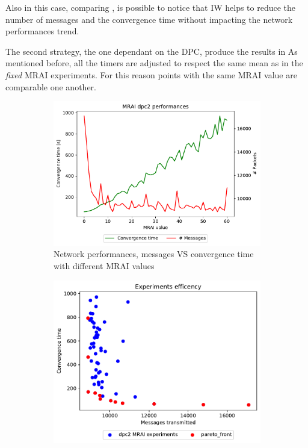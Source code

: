 Also in this case, comparing ,
is possible to notice that \ac{IW}
helps to reduce the number of messages and the convergence time without impacting
the network performances trend.

The second strategy, the one dependant on the \ac{DPC}, produce the results
in 
As mentioned before, all the timers are adjusted to respect the same mean as in
the \textit{fixed} \ac{MRAI} experiments.
For this reason points with the same \ac{MRAI} value are comparable one another.

\begin{figure}[h]
     \centering
     \begin{subfigure}[b]{0.45\textwidth}
         \centering
         \includegraphics[width=\textwidth]{images/internet_like/1000/dpc/internet_like-DPC_mrai_evolution.pdf}
		 \caption{Network performances, messages VS convergence time with different
			\ac{MRAI} values}
         \label{fig:internt_like_1000_DPC_evolution_evolution}
     \end{subfigure}
     \hfill
     \begin{subfigure}[b]{0.45\textwidth}
         \centering
         \includegraphics[width=\textwidth]{images/internet_like/1000/dpc/internet_like-DPC.pdf}

\end{subfigure}
\end{figure}
